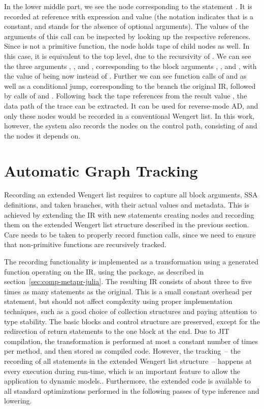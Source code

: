 In the lower middle part, we see the node corresponding to the statement .  It is recorded at reference  with expression  and value
 (the notation  indicates that  is a constant, and 
stands for the absence of optional arguments). The values of the arguments of this call can be
inspected by looking up the respective references.  Since  is not a primitive function,
the node holds tape of child nodes as well.  In this case, it is equivalent to the top level, due to
the recursivity of . We can see the three arguments , , and
, corresponding to the block arguments , , and , with the
value of  being now  instead of .  Further we can see function calls of
 and \jlinl{<} as well as a conditional jump, corresponding to the branch the original
IR, followed by calls of \jlinl{+} and . Following back the tape references from the
result value , the data path of the trace can be extracted.  It can be used for
reverse-mode AD, and only these nodes would be recorded in a conventional Wengert list.  In this
work, however, the system also records the nodes on the control path, consisting of  and
the nodes it depends on.


\section{Automatic Graph Tracking}
\label{sec:autom-graph-track}

Recording an extended Wengert list requires to capture all block arguments, SSA definitions, and
taken branches, with their actual values and metadata. This is achieved by extending the IR with new
statements creating nodes and recording them on the extended Wengert list structure described in the
previous section. Care needs to be taken to properly record function calls, since we need to ensure
that non-primitive functions are recursively tracked.

The recording functionality is implemented as a transformation using a generated function operating
on the IR, using the  package, as described in
section~\ref{sec:comp-metapr-julia}.  The resulting IR consists of about three to five times as many
statements as the original. This is a small constant overhead per statement, but should not affect
complexity using proper implementation techniques, such as a good choice of collection structures
and paying attention to type stability.  The basic blocks and control structure are preserved,
except for the redirection of return statements to the one block at the end.  Due to JIT
compilation, the transformation is performed at most a constant number of times per method, and then
stored as compiled code.  However, the tracking~-- the recording of all statements in the extended
Wengert list structure~-- happens at every execution during run-time, which is an important feature
to allow the application to dynamic models..  Furthermore, the extended code is available to all
standard optimizations performed in the following passes of type inference and lowering.

